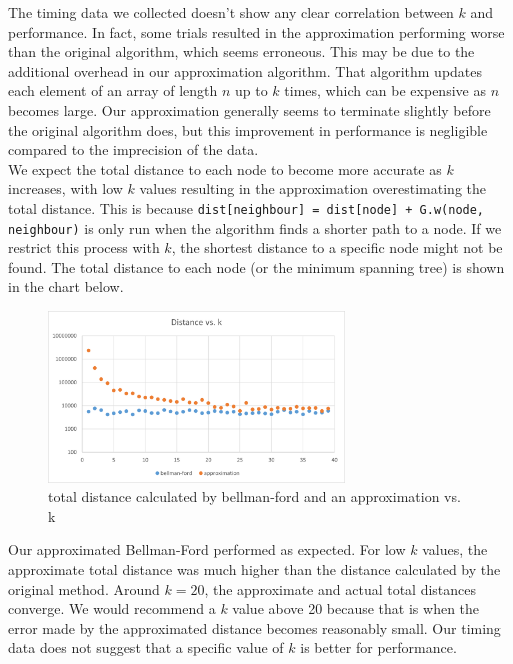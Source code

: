 \documentclass[12pt]{article}
\begin{document}
\noindent The timing data we collected doesn't show any clear correlation between $k$ and performance. In fact, some trials resulted in the approximation performing worse than the original algorithm, which seems erroneous. This may be due to the additional overhead in our approximation algorithm. That algorithm updates each element of an array of length $n$ up to $k$ times, which can be expensive as $n$ becomes large. Our approximation generally seems to terminate slightly before the original algorithm does, but this improvement in performance is negligible compared to the imprecision of the data.\\
We expect the total distance to each node to become more accurate as $k$ increases, with low $k$ values resulting in the approximation overestimating the total distance. This is because \verb-dist[neighbour] = dist[node] + G.w(node, neighbour)- is only run when the algorithm finds a shorter path to a node. If we restrict this process with $k$, the shortest distance to a specific node might not be found. The total distance to each node (or the minimum spanning tree) is shown in the chart below.
\begin{figure}[H]
\centering
\includegraphics[width=0.7\textwidth,height=\textheight,keepaspectratio]{bellman_ford_dist.png}
\caption{total distance calculated by bellman-ford and an approximation vs. k}
\label{Figure: m2}
\end{figure}
Our approximated Bellman-Ford performed as expected. For low $k$ values, the approximate total distance was much higher than the distance calculated by the original method. Around $k=20$, the approximate and actual total distances converge. We would recommend a $k$ value above 20 because that is when the error made by the approximated distance becomes reasonably small. Our timing data does not suggest that a specific value of $k$ is better for performance. 
\end{document}
